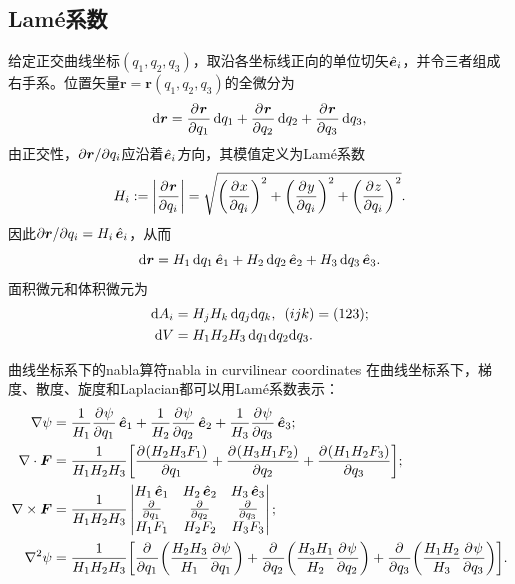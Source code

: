 \subsection{Lam\'e系数}

给定正交曲线坐标$(q_1,q_2,q_3)$，取沿各坐标线正向的单位切矢$\uvec e_i$，并令三者组成右手系。位置矢量$\bm r = \bm r(q_1,q_2,q_3)$的全微分为
\[
    \d\bm r = \pv{\bm r}{q_1}\d q_1 + \pv{\bm r}{q_2}\d q_2 + \pv{\bm r}{q_3}\d q_3,
\]
由正交性，$\p\bm r/\p q_i$应沿着$\uvec e_i$方向，其模值定义为Lam\'e系数
\begin{equation}
    H_i := \biggabs{\pv{\bm r}{q_i}} = \sqrt{\biggp{\pv x{q_i}}^2 + \biggp{\pv y{q_i}}^2 + \biggp{\pv z{q_i}}^2}.
\end{equation}
因此$\p\bm r/\p q_i = H_i\uvec e_i$，从而
\begin{equation}
    \d\bm r = H_1\d q_1\uvec e_1 + H_2\d q_2\uvec e_2 + H_3\d q_3\uvec e_3.
\end{equation}
面积微元和体积微元为
\begin{align}
    \d A_i &= H_jH_k\d q_j\nd q_k,\enspace (ijk) = (123);\\
    \d V &= H_1H_2H_3\d q_1\nd q_2\nd q_3.
\end{align}

\begin{theorem}
    {曲线坐标系下的nabla算符}{nabla in curvilinear coordinates}
    在曲线坐标系下，梯度、散度、旋度和Laplacian都可以用Lam\'e系数表示：
    \begin{align}
        \label{eqn:grad Lame}
        \grad\psi &= \frac1{H_1}\pv\psi{q_1}\uvec e_1 + \frac1{H_2}\pv\psi{q_2}\uvec e_2 + \frac1{H_3}\pv\psi{q_3}\uvec e_3;\\
        \label{eqn:div Lame}
        \div\bm F &= \frac1{H_1H_2H_3}\biggb{\pv{(H_2H_3F_1)}{q_1} + \pv{(H_3H_1F_2)}{q_2} + \pv{(H_1H_2F_3)}{q_3}};\\
        \label{eqn:curl Lame}
        \curl\bm F &= \frac1{H_1H_2H_3}\begin{vmatrix}
            H_1\uvec e_1&H_2\uvec e_2&H_3\uvec e_3\\
            \pp{q_1}&\pp{q_2}&\pp{q_3}\\
            H_1F_1&H_2F_2&H_3F_3
        \end{vmatrix};\\
        \label{eqn:Laplacian Lame}
        \laplacian\psi &= \frac1{H_1H_2H_3}\biggb{\pp{q_1}\biggp{\frac{H_2H_3}{H_1}\pv\psi{q_1}} + \pp{q_2}\biggp{\frac{H_3H_1}{H_2}\pv\psi{q_2}} + \pp{q_3}\biggp{\frac{H_1H_2}{H_3}\pv\psi{q_3}}}.
    \end{align}
\end{theorem}

